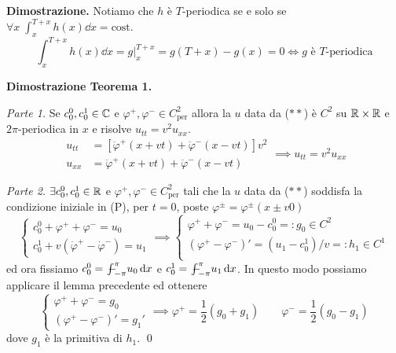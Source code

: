 \textbf{Dimostrazione.}
Notiamo che $h$ è $T$-periodica se e solo se $\forall x \; \int_{x}^{T+x} h(x) \dd x = \text{cost.}$
$$
\int_{x}^{T+x} h(x) \dd x = g \Big|_x^{T+x} = g(T + x) - g(x) = 0 \iff \text{$g$ è $T$-periodica}
$$

\textbf{Dimostrazione Teorema 1.}

\textit{Parte 1.}
Se $c_0^0, c_0^1 \in \mathbb C$ e $\varphi^+, \varphi^- \in C^2_\text{per}$ allora la $u$ data da ($**$) è $C^2$ su $\mathbb R \times \mathbb R$ e $2\pi$-periodica in $x$ e risolve $u_{tt} = v^2 u_{xx}$.
$$
\begin{aligned}
	u_{tt} &= [\ddot \varphi^+(x + vt) + \ddot \varphi^-(x - vt)] v^2 \\
	u_{xx} &= \ddot \varphi^+(x + vt) + \ddot \varphi^-(x - vt)
\end{aligned}
\implies u_{tt} = v^2 u_{xx}
$$

\textit{Parte 2.}
$\exists c_0^0, c_0^1 \in \mathbb R$ e $\varphi^+, \varphi^- \in C^2_\text{per}$ tali che la $u$ data da ($**$) soddisfa la condizione iniziale in (P), per $t = 0$, poste $\varphi^\pm = \varphi^\pm(x \pm v0)$
$$
\begin{cases}
	c_0^0 + \varphi^+ + \varphi^- = u_0 \\
	c_0^1 + v(\dot \varphi^+ - \dot \varphi^-) = u_1
\end{cases}
\implies
\begin{cases}
	\varphi^+ + \varphi^- = u_0 - c_0^0 =: g_0 \in C^2 \\
	(\varphi^+ - \varphi^-)' = (u_1 - c_0^1) / v =: h_1 \in C^1 \\
\end{cases}
$$
ed ora fissiamo $c_0^0 = \avint_{-\pi}^\pi u_0 \dd x$ e $c_0^1 = \avint_{-\pi}^\pi u_1 \dd x$. In questo modo possiamo applicare il lemma precedente ed ottenere
$$
\begin{cases}
	\varphi^+ + \varphi^- = g_0 \\
	(\varphi^+ - \varphi^-)' = g_1'
\end{cases}
\implies
\varphi^+ = \frac{1}{2}(g_0 + g_1)
\qquad
\varphi^- = \frac{1}{2}(g_0 - g_1)
$$
dove $g_1$ è la primitiva di $h_1$.
\qed




